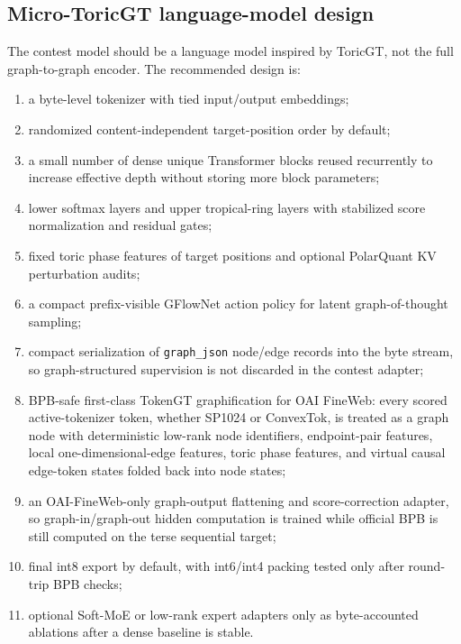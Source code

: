 \documentclass[11pt]{article}
\theoremstyle{definition}
\theoremstyle{plain}
\theoremstyle{remark}
\numberwithin{equation}{section}
\begin{document}
\subsection{Micro-ToricGT language-model design}

The contest model should be a language model inspired by ToricGT, not the full graph-to-graph encoder.  The recommended design is:
\begin{enumerate}[leftmargin=2em]
  \item a byte-level tokenizer with tied input/output embeddings;
  \item randomized content-independent target-position order by default;
  \item a small number of dense unique Transformer blocks reused recurrently to increase effective depth without storing more block parameters;
  \item lower softmax layers and upper tropical-ring layers with stabilized score normalization and residual gates;
  \item fixed toric phase features of target positions and optional PolarQuant KV perturbation audits;
  \item a compact prefix-visible GFlowNet action policy for latent graph-of-thought sampling;
  \item compact serialization of \texttt{graph\_json} node/edge records into the byte stream, so graph-structured supervision is not discarded in the contest adapter;
  \item BPB-safe first-class TokenGT graphification for OAI FineWeb: every scored active-tokenizer token, whether SP1024 or ConvexTok, is treated as a graph node with deterministic low-rank node identifiers, endpoint-pair features, local one-dimensional-edge features, toric phase features, and virtual causal edge-token states folded back into node states;
  \item an OAI-FineWeb-only graph-output flattening and score-correction adapter, so graph-in/graph-out hidden computation is trained while official BPB is still computed on the terse sequential target;
  \item final int8 export by default, with int6/int4 packing tested only after round-trip BPB checks;
  \item optional Soft-MoE or low-rank expert adapters only as byte-accounted ablations after a dense baseline is stable.
\end{enumerate}
\end{document}
